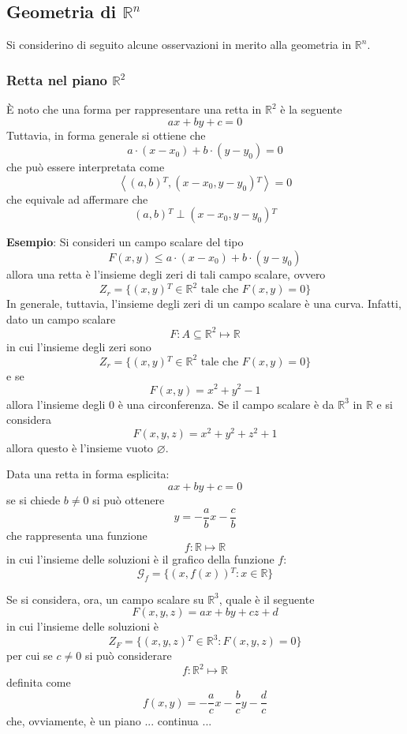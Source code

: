 \documentclass[a4paper]{extarticle}
\begin{document}
\vspace{1em}
\subsection{Geometria di $\mathbb{R}^n$}
Si considerino di seguito alcune osservazioni in merito alla geometria in $\mathbb{R}^n$.

\vspace{1em}
\subsubsection{Retta nel piano $\mathbb{R}^2$}
È noto che una forma per rappresentare una retta in $\mathbb{R}^2$ è la seguente
\[ax+by+c=0\]
Tuttavia, in forma generale si ottiene che
\[a \cdot (x-x_0) + b \cdot (y-y_0) = 0\]
che può essere interpretata come
\[\left<\left(a,b\right){^T},\left(x-x_0,y-y_0\right){^T}\right> = 0\]
che equivale ad affermare che
\[\left(a,b\right){^T} \perp \left(x-x_0,y-y_0\right){^T}\]

\vspace{1em}
\noindent
\textbf{Esempio}: Si consideri un campo scalare del tipo
\[F(x,y) \leq a \cdot (x-x_0) + b \cdot (y-y_0)\]
allora una retta è l'insieme degli zeri di tali campo scalare, ovvero
\[Z_r = \{(x,y){^T} \in \mathbb{R}^2 \text{ tale che } F(x,y) = 0\}\]
In generale, tuttavia, l'insieme degli zeri di un campo scalare è una curva. Infatti, dato un campo scalare
\[F : A \subseteq \mathbb{R}^2 \longmapsto \mathbb{R}\]
in cui l'insieme degli zeri sono 
\[Z_r = \{(x,y){^T} \in \mathbb{R}^2 \text{ tale che } F(x,y) = 0\}\]
e se
\[F(x,y) = x^2+y^2-1\]
allora l'insieme degli $0$ è una circonferenza. Se il campo scalare è da $\mathbb{R}^3$ in $\mathbb{R}$ e si considera
\[F(x,y,z) = x^2+y^2+z^2+1\]
allora questo è l'insieme vuoto $\varnothing$.

\vspace{1em}
\noindent
Data una retta in forma esplicita:
\[ax + by + c = 0\]
se si chiede $b \neq 0$ si può ottenere
\[y=-\frac{a}{b} x - \frac{c}{b}\]
che rappresenta una funzione
\[f : \mathbb{R} \longmapsto \mathbb{R}\]
in cui l'insieme delle soluzioni è il grafico della funzione $f$:
\[\mathcal{G}_f = \{(x,f(x)){^T} : x \in \mathbb{R}\}\]

\vspace{1em}
\noindent
Se si considera, ora, un campo scalare su $\mathbb{R}^3$, quale è il seguente
\[F(x,y,z) = ax+by+cz+d\]
in cui l'insieme delle soluzioni è
\[Z_F = \{(x,y,z){^T} \in \mathbb{R}^3 : F(x,y,z) = 0\}\]
per cui se $c \neq 0$ si può considerare
\[f : \mathbb{R}^2 \longmapsto \mathbb{R}\]
definita come
\[f(x,y)=-\frac{a}{c} x - \frac{b}{c} y - \frac{d}{c}\]
che, ovviamente, è un piano 
... continua ...
\end{document}

